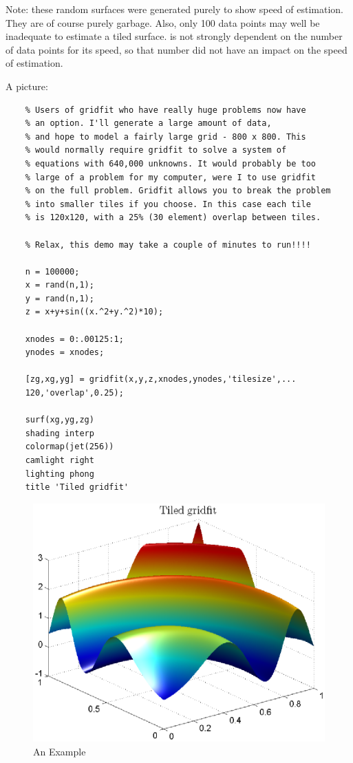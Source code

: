 \documentclass[a4paper,11pt]{article}
\newcommand{\G}{\mcode{GRIDFIT}}
\begin{document}
Note: these random surfaces were generated purely to show speed of
estimation. They are of course purely garbage. Also, only 100 data
points may well be inadequate to estimate a tiled surface. \G{} is
not strongly dependent on the number of data points for its speed,
so that number did not have an impact on the speed of estimation.

A picture:

\begin{lstlisting}
    % Users of gridfit who have really huge problems now have
    % an option. I'll generate a large amount of data,
    % and hope to model a fairly large grid - 800 x 800. This
    % would normally require gridfit to solve a system of
    % equations with 640,000 unknowns. It would probably be too
    % large of a problem for my computer, were I to use gridfit
    % on the full problem. Gridfit allows you to break the problem
    % into smaller tiles if you choose. In this case each tile
    % is 120x120, with a 25% (30 element) overlap between tiles.

    % Relax, this demo may take a couple of minutes to run!!!!

    n = 100000;
    x = rand(n,1);
    y = rand(n,1);
    z = x+y+sin((x.^2+y.^2)*10);

    xnodes = 0:.00125:1;
    ynodes = xnodes;

    [zg,xg,yg] = gridfit(x,y,z,xnodes,ynodes,'tilesize',...
    120,'overlap',0.25);

    surf(xg,yg,zg)
    shading interp
    colormap(jet(256))
    camlight right
    lighting phong
    title 'Tiled gridfit'
\end{lstlisting}

\begin{figure}
\centering
    \includegraphics[width=5in]{gfit.eps}
        \caption{An Example}
\end{figure}
\end{document}
